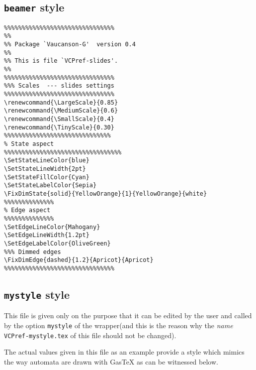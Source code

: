 \documentclass[11pt,twoside]{article}
\begin{document}
{\subsection{\texttt{beamer} style}


{\footnotesize
\begin{verbatim}
%%%%%%%%%%%%%%%%%%%%%%%%%%%%%%%
%%
%% Package `Vaucanson-G'  version 0.4
%%
%% This is file `VCPref-slides'.
%%
%%%%%%%%%%%%%%%%%%%%%%%%%%%%%%%
%%% Scales  --- slides settings
%%%%%%%%%%%%%%%%%%%%%%%%%%%%%%%
\renewcommand{\LargeScale}{0.85}       
\renewcommand{\MediumScale}{0.6}       
\renewcommand{\SmallScale}{0.4}		
\renewcommand{\TinyScale}{0.30}		
%%%%%%%%%%%%%%%%%%%%%%%%%%%%%%
% State aspect
%%%%%%%%%%%%%%%%%%%%%%%%%%%%%%%%%
\SetStateLineColor{blue}
\SetStateLineWidth{2pt}
\SetStateFillColor{Cyan}
\SetStateLabelColor{Sepia}
\FixDimState{solid}{YellowOrange}{1}{YellowOrange}{white}
%%%%%%%%%%%%%%
% Edge aspect
%%%%%%%%%%%%%%
\SetEdgeLineColor{Mahogany}
\SetEdgeLineWidth{1.2pt}
\SetEdgeLabelColor{OliveGreen}
%%% Dimmed edges
\FixDimEdge{dashed}{1.2}{Apricot}{Apricot}
%%%%%%%%%%%%%%%%%%%%%%%%%%%%%%%
\end{verbatim}}
\newpage 

\subsection{\texttt{mystyle} style}

This file is given only on the purpose that it can be edited by the 
user and called by the option \texttt{mystyle} of the wrapper(and this is the 
reason why the \emph{name} \verb+VCPref-mystyle.tex+ 
of this file should not be changed).

The actual values given in this file as an example provide a style 
which mimics the way automata are drawn with GasTeX \cite{Gast} as 
can be witnessed below.

}
\end{document}
